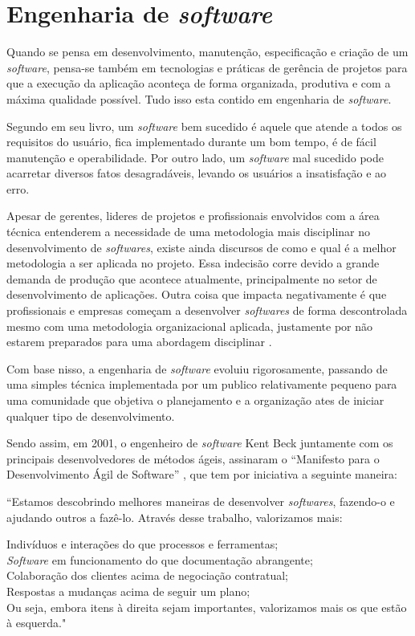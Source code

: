 \section{\textbf{{Engenharia de \textit{software}}}}
\label{engenharia-software}

Quando se pensa em desenvolvimento, manutenção, especificação e criação de um \textit{software}, pensa-se também em tecnologias e práticas de gerência de projetos para que a execução da aplicação aconteça de forma organizada, produtiva e com a máxima qualidade possível. Tudo isso esta contido em engenharia de \textit{software}.

Segundo  em seu livro, um \textit{software} bem sucedido é aquele que atende a todos os requisitos do usuário, fica implementado durante um bom tempo, é de fácil manutenção e operabilidade. Por outro lado, um \textit{software} mal sucedido pode acarretar diversos fatos desagradáveis, levando os usuários a insatisfação e ao erro. 

Apesar de gerentes, lideres de projetos e profissionais envolvidos com a área técnica entenderem a necessidade de uma metodologia mais disciplinar no desenvolvimento de \textit{softwares}, existe ainda discursos de como e qual é a melhor metodologia a ser aplicada no projeto. Essa indecisão corre devido a grande demanda de produção que acontece atualmente, principalmente no setor de desenvolvimento de aplicações. Outra coisa que impacta negativamente é que profissionais e empresas começam a desenvolver \textit{softwares} de forma descontrolada mesmo com uma metodologia organizacional aplicada, justamente por não estarem preparados para uma abordagem disciplinar \cite{PRESSMAN2016}. 

Com base nisso, a engenharia de \textit{software} evoluiu rigorosamente, passando de uma simples técnica implementada por um publico relativamente pequeno para uma comunidade que objetiva o planejamento e a organização ates de iniciar qualquer tipo de desenvolvimento.

Sendo assim, em 2001, o engenheiro de \textit{software} Kent Beck juntamente com os principais
desenvolvedores de métodos ágeis, assinaram o “Manifesto para o Desenvolvimento Ágil de Software” \cite{SOMMERVILLE2011}, que tem por iniciativa a seguinte maneira:

\begin{citacao}
“Estamos descobrindo melhores maneiras de desenvolver \textit{softwares}, fazendo-o e ajudando outros a fazê-lo. Através desse trabalho, valorizamos mais:

Indivíduos e interações do que processos e ferramentas;\\
\textit{Software} em funcionamento do que documentação abrangente;\\
Colaboração dos clientes acima de negociação contratual;\\
Respostas a mudanças acima de seguir um plano;\\
Ou seja, embora itens à direita sejam importantes, valorizamos mais os que estão à esquerda.\cite{SOMMERVILLE2011}"

\end{citacao}


